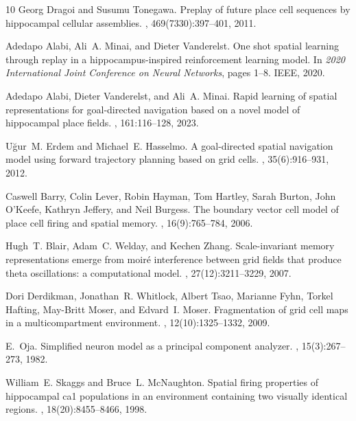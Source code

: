 \documentclass[conference]{IEEEtran}
\begin{document}
\begin{thebibliography}{10}
Georg Dragoi and Susumu Tonegawa.
\newblock Preplay of future place cell sequences by hippocampal cellular
  assemblies.
, 469(7330):397--401, 2011.

Adedapo Alabi, Ali~A. Minai, and Dieter Vanderelst.
\newblock One shot spatial learning through replay in a hippocampus-inspired
  reinforcement learning model.
\newblock In {\em 2020 International Joint Conference on Neural Networks},
  pages 1--8. IEEE, 2020.

Adedapo Alabi, Dieter Vanderelst, and Ali~A. Minai.
\newblock Rapid learning of spatial representations for goal-directed
  navigation based on a novel model of hippocampal place fields.
, 161:116--128, 2023.

U{\u{g}}ur~M. Erdem and Michael~E. Hasselmo.
\newblock A goal-directed spatial navigation model using forward trajectory
  planning based on grid cells.
, 35(6):916--931, 2012.

Caswell Barry, Colin Lever, Robin Hayman, Tom Hartley, Sarah Burton, John
  {O'Keefe}, Kathryn Jeffery, and Neil Burgess.
\newblock The boundary vector cell model of place cell firing and spatial
  memory.
, 16(9):765--784, 2006.

Hugh~T. Blair, Adam~C. Welday, and Kechen Zhang.
\newblock Scale-invariant memory representations emerge from moir{\'e}
  interference between grid fields that produce theta oscillations: a
  computational model.
, 27(12):3211--3229, 2007.

Dori Derdikman, Jonathan~R. Whitlock, Albert Tsao, Marianne Fyhn, Torkel
  Hafting, May-Britt Moser, and Edvard~I. Moser.
\newblock Fragmentation of grid cell maps in a multicompartment environment.
, 12(10):1325--1332, 2009.

E.~Oja.
\newblock Simplified neuron model as a principal component analyzer.
, 15(3):267--273, 1982.

William~E. Skaggs and Bruce~L. McNaughton.
\newblock Spatial firing properties of hippocampal ca1 populations in an
  environment containing two visually identical regions.
, 18(20):8455--8466, 1998.

\end{thebibliography}
\end{document}
